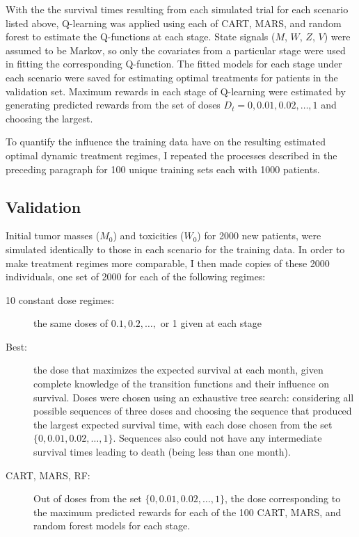 \documentclass[12pt]{article}
\begin{document}
With the the survival times resulting from each simulated trial for each scenario listed above, Q-learning was applied using each of CART, MARS, and random forest to estimate the Q-functions at each stage. State signals ($M$, $W$, $Z$, $V$) were assumed to be Markov, so only the covariates from a particular stage were used in fitting the corresponding Q-function. The fitted models for each stage under each scenario were saved for estimating optimal treatments for patients in the validation set.  Maximum rewards in each stage of Q-learning were estimated by generating predicted rewards from the set of doses $D_{t} = 0, 0.01, 0.02, \ldots, 1$ and choosing the largest.

To quantify the influence the training data have on the resulting estimated optimal dynamic treatment regimes, I repeated the processes described in the preceding paragraph for 100 unique training sets each with 1000 patients.


\subsection{Validation} %
\label{sub:validation}

Initial tumor masses ($M_{0}$) and toxicities ($W_{0}$) for 2000 new patients, were simulated identically to those in each scenario for the training data. In order to make treatment regimes more comparable, I then made copies of these 2000 individuals, one set of 2000 for each of the following regimes:

\begin{description}
  \item [10 constant dose regimes:] the same doses of $0.1, 0.2, \ldots,$ or 1 given at each stage
  \item [Best:] the dose that maximizes the expected survival at each month, given complete knowledge of the transition functions and their influence on survival. Doses were chosen using an exhaustive tree search: considering all possible sequences of three doses and choosing the sequence that produced the largest expected survival time, with each dose chosen from the set $\{0, 0.01, 0.02, \ldots, 1\}$. Sequences also could not have any intermediate survival times leading to death (being less than one month).
  \item [CART, MARS, RF:] Out of doses from the set $\{0, 0.01, 0.02, \ldots, 1\}$, the dose corresponding to the maximum predicted rewards for each of the 100 CART, MARS, and random forest models for each stage.
\end{description}
\end{document}
